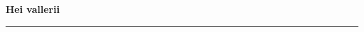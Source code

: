 \documentclass[10pt]{book}
\begin{document}
{
  \samepage
  \raggedbottom
  \raggedright
  \sloppy


  \vspace{0.2in}

  \noindent\begin{minipage}{.1\textwidth}
    \hfill\vspace{0.1in}
  \end{minipage}%
  \noindent\begin{minipage}{.8\textwidth}
    \centering
    \bfseries
    \large Hei vallerii
  \end{minipage}%
  \noindent\begin{minipage}{.1\textwidth}
      \hfill\vspace{0.1in}
  \end{minipage}

  \nopagebreak[4]
  \vspace{0.1in}
  \nopagebreak[4]
  \hrule height 0.05ex
  \nopagebreak[4]
  \vspace{-0.05in}



  \vspace{0.01in}
  \nopagebreak[4]
  {%
\parindent 0pt
\noindent
\ifx\preLilyPondExample \undefined
\else
  \expandafter\preLilyPondExample
\fi
\def\lilypondbook{}%

\ifx\postLilyPondExample \undefined
\else
  \expandafter\postLilyPondExample
\fi
}

}
\end{document}

